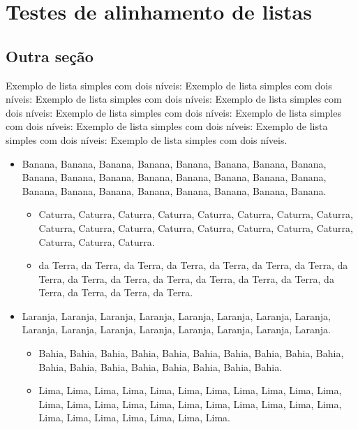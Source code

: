 \chapter{Testes de alinhamento de listas}


\section{Outra seção}

Exemplo de lista simples com dois níveis: Exemplo de lista simples com dois níveis: Exemplo de lista simples com dois níveis: Exemplo de lista simples com dois níveis: Exemplo de lista simples com dois níveis: Exemplo de lista simples com dois níveis: Exemplo de lista simples com dois níveis: Exemplo de lista simples com dois níveis: Exemplo de lista simples com dois níveis.

\begin{itemize}

\item Banana, Banana, Banana, Banana, Banana, Banana, Banana, Banana, Banana, Banana, Banana, Banana, Banana, Banana, Banana, Banana, Banana, Banana, Banana, Banana, Banana, Banana, Banana, Banana.

\begin{itemize}

\item Caturra, Caturra, Caturra, Caturra, Caturra, Caturra, Caturra, Caturra, Caturra, Caturra, Caturra, Caturra, Caturra, Caturra, Caturra, Caturra, Caturra, Caturra, Caturra.

\item da Terra, da Terra, da Terra, da Terra, da Terra, da Terra, da Terra, da Terra, da Terra, da Terra, da Terra, da Terra, da Terra, da Terra, da Terra, da Terra, da Terra, da Terra.

\end{itemize}

\item Laranja, Laranja, Laranja, Laranja, Laranja, Laranja, Laranja, Laranja, Laranja, Laranja, Laranja, Laranja, Laranja, Laranja, Laranja, Laranja.

\begin{itemize}

\item Bahia, Bahia, Bahia, Bahia, Bahia, Bahia, Bahia, Bahia, Bahia, Bahia, Bahia, Bahia, Bahia, Bahia, Bahia, Bahia, Bahia, Bahia.

\item Lima, Lima, Lima, Lima, Lima, Lima, Lima, Lima, Lima, Lima, Lima, Lima, Lima, Lima, Lima, Lima, Lima, Lima, Lima, Lima, Lima, Lima, Lima, Lima, Lima, Lima, Lima, Lima, Lima.

\end{itemize}

\end{itemize}

